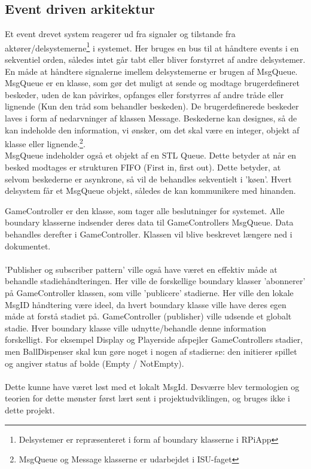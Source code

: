 \documentclass[Softwaredesign/Softwaredesign_main.tex]{subfiles}
\begin{document}
\subsection{Event driven arkitektur}
Et event drevet system reagerer ud fra signaler og tilstande fra aktører/delsystemerne\footnote{Delsystemer er repræsenteret i form af boundary klasserne i RPiApp} i systemet. 
Her bruges en bus til at håndtere events i en sekventiel orden, således intet går tabt eller bliver forstyrret af andre delsystemer. 
\\En måde at håndtere signalerne imellem delsystemerne er brugen af MsgQueue. MsgQueue er en klasse, som gør det muligt at sende og modtage brugerdefineret beskeder, uden de kan påvirkes, opfanges eller forstyrres af andre tråde eller lignende (Kun den tråd som behandler beskeden). De brugerdefinerede beskeder laves i form af nedarvninger af klassen Message. Beskederne kan designes, så de kan indeholde den information, vi ønsker, om det skal være en integer, objekt af klasse eller lignende.\footnote{MsgQueue og Message klasserne er udarbejdet i ISU-faget}. 
\\MsgQueue indeholder også et objekt af en STL Queue. Dette betyder at når en besked modtages er strukturen FIFO (First in, first out). Dette betyder, at selvom beskederne er asynkrone, så vil de behandles sekventielt i 'køen'. Hvert delsystem får et MsgQueue objekt, således de kan kommunikere med hinanden.

GameController er den klasse, som tager alle beslutninger for systemet. Alle boundary klasserne indsender deres data til GameControllers MsgQueue. Data behandles derefter i GameController. Klassen vil blive beskrevet længere ned i dokumentet. 
\\\\'Publisher og subscriber pattern' ville også have været en effektiv måde at behandle stadiehåndteringen. Her ville de forskellige boundary klasser 'abonnerer' på GameController klassen, som ville 'publicere' stadierne. Her ville den lokale MsgID håndtering være ideel, da hvert boundary klasse ville have deres egen måde at forstå stadiet på. GameController (publisher) ville udsende et globalt stadie. Hver boundary klasse ville udnytte/behandle denne information forskelligt. For eksempel Display og Playerside afspejler GameControllers stadier, men BallDispenser skal kun gøre noget i nogen af stadierne: den initierer spillet og angiver status af bolde (Empty / NotEmpty).
\\\\Dette kunne have været løst med et lokalt MsgId. Desværre blev termologien og teorien for dette mønster først lært sent i projektudviklingen, og bruges ikke i dette projekt. 
\end{document}
